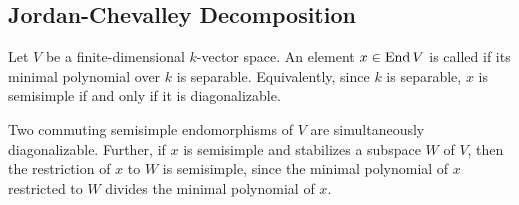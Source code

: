\subsection{Jordan-Chevalley Decomposition}

\begin{definition}
    Let $V$ be a finite-dimensional $k$-vector space. An element $x\in\operatorname{End} V$ is called  if its minimal polynomial over $k$ is separable. Equivalently, since $k$ is separable, $x$ is semisimple if and only if it is diagonalizable.
\end{definition}

\begin{remark}
    Two commuting semisimple endomorphisms of $V$ are simultaneously diagonalizable. Further, if $x$ is semisimple and stabilizes a subspace $W$ of $V$, then the restriction of $x$ to $W$ is semisimple, since the minimal polynomial of $x$ restricted to $W$ divides the minimal polynomial of $x$.
\end{remark}


